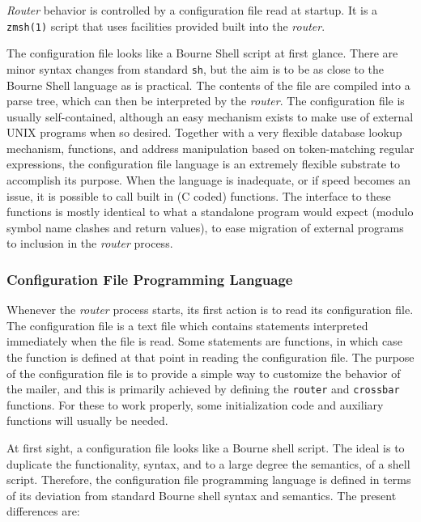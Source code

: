 {\em Router\/} behavior is controlled by a configuration file read at 
startup. It is a {\tt zmsh(1)} script that uses facilities provided 
built into the {\em router\/}. 

The configuration file looks like a Bourne Shell script at first glance.
There are minor syntax changes from standard {\tt sh}, but the aim is to be as
close to the Bourne Shell language as is practical. The contents of the
file are compiled into a parse tree, which can then be interpreted by the
{\em router\/}.  The configuration file is usually self-contained, although an easy
mechanism exists to make use of external UNIX programs when so desired.
Together with a very flexible database lookup mechanism, functions, and
address manipulation based on token-matching regular expressions, the
configuration file language is an extremely flexible substrate to
accomplish its purpose. When the language is inadequate, or if speed
becomes an issue, it is possible to call built in (C coded) functions. The
interface to these functions is mostly identical to what a standalone
program would expect (modulo symbol name clashes and return values), to
ease migration of external programs to inclusion in the {\em router\/} process.




\subsubsection{Configuration File Programming Language}



Whenever the {\em router\/} process starts, its first action is to read its
configuration file.  The configuration file is a text file which contains
statements interpreted immediately when the file is read.  Some statements
are functions, in which case the function is defined at that point in
reading the configuration file.  The purpose of the configuration file is
to provide a simple way to customize the behavior of the mailer, and this
is primarily achieved by defining the {\tt router} and {\tt crossbar} 
functions. For these to work properly, some initialization code and auxiliary
functions will usually be needed.

At first sight, a configuration file looks like a Bourne shell script.
The ideal is to duplicate the functionality, syntax, and to a large
degree the semantics, of a shell script.  Therefore, the configuration file
programming language is defined in terms of its deviation from standard
Bourne shell syntax and semantics.  The present differences are:

